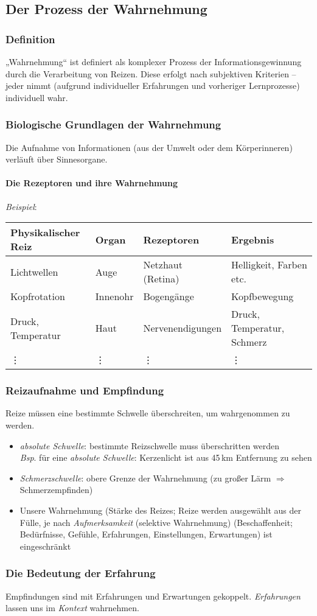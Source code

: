 \documentclass[12pt]{scrartcl}
\begin{document}
\subsection{Der Prozess der Wahrnehmung}

\subsubsection{Definition}
„Wahrnehmung“ ist definiert als komplexer Prozess der Informationsgewinnung
durch die Verarbeitung von Reizen. Diese erfolgt nach subjektiven Kriterien --
jeder nimmt (aufgrund individueller Erfahrungen und vorheriger Lernprozesse)
individuell wahr.

\subsubsection{Biologische Grundlagen der Wahrnehmung}
Die Aufnahme von Informationen (aus der Umwelt oder dem Körperinneren) verläuft
über Sinnesorgane.

\paragraph{Die Rezeptoren und ihre Wahrnehmung}
\emph{Beispiel}:\\
\begin{tabular}{llll}
	Physikalischer Reiz & Organ & Rezeptoren & Ergebnis \\
	\hline
	Lichtwellen & Auge & Netzhaut (Retina) & Helligkeit, Farben etc. \\
	Kopfrotation & Innenohr & Bogengänge & Kopfbewegung \\
	Druck, Temperatur & Haut & Nervenendigungen & Druck, Temperatur, Schmerz \\
	\vdots & \vdots & \vdots & \vdots
\end{tabular}

\subsubsection{Reizaufnahme und Empfindung}
Reize müssen eine bestimmte Schwelle überschreiten, um wahrgenommen zu werden.
\begin{itemize}
	\item \emph{absolute Schwelle}: bestimmte Reizschwelle muss überschritten
		werden\\
		\emph{Bsp}. für eine \emph{absolute Schwelle}: Kerzenlicht ist aus
		45\,km Entfernung zu sehen
	\item \emph{Schmerzschwelle}: obere Grenze der Wahrnehmung (zu großer Lärm
		\(\Rightarrow\) Schmerzempfinden)
	\item Unsere Wahrnehmung (Stärke des Reizes; Reize werden ausgewählt aus
		der Fülle, je nach \emph{Aufmerksamkeit} (selektive Wahrnehmung)
		(Beschaffenheit; Bedürfnisse, Gefühle, Erfahrungen, Einstellungen,
		Erwartungen) ist eingeschränkt
\end{itemize}

\subsubsection{Die Bedeutung der Erfahrung}
Empfindungen sind mit Erfahrungen und Erwartungen gekoppelt. \emph{Erfahrungen}
lassen uns im \emph{Kontext} wahrnehmen. %
\end{document}
